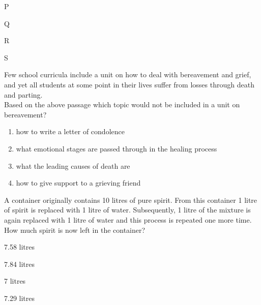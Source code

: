 \begin{enumerate}
\begin{multicols}{4}
\item P
\item Q
\item R
\item S
\end{multicols}
\end{enumerate}
\item Few school curricula include a unit on how to deal with bereavement and grief, and yet all students at some point in their lives suffer from losses through death and parting.\\
Based on the above passage which topic would not be included in a unit on bereavement?
\begin{enumerate}
\item how to write a letter of condolence
\item what emotional stages are passed through in the healing process
\item what the leading causes of death are
\item how to give support to a grieving friend
\end{enumerate}
\item A container originally contains 10 litres of pure spirit. From this container 1 litre of spirit is replaced with 1 litre of water. Subsequently, 1 litre of the mixture is again replaced with 1 litre of water and this process is repeated one more time. How much spirit is now left in the container?
\begin{enumerate}
\begin{multicols}{2}
\item 7.58 litres
\item 7.84 litres
\item 7 litres
\item 7.29 litres
\end{multicols}
\end{enumerate}

